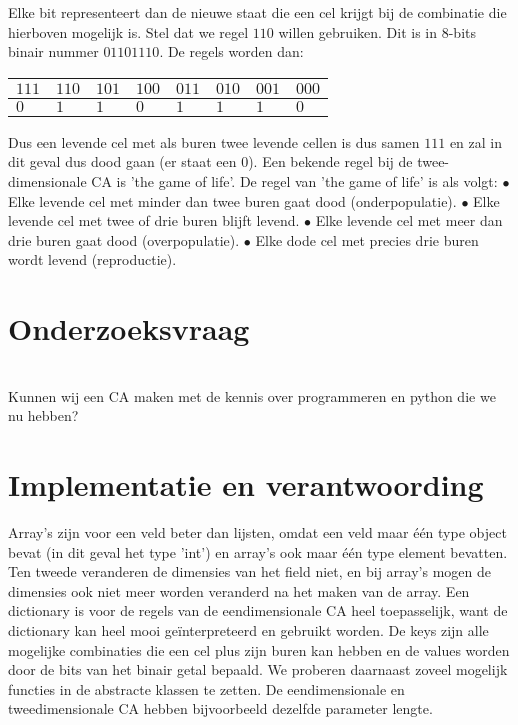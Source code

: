 \documentclass[12pt,a4paper]{article}
\begin{document}
Elke bit representeert dan de nieuwe staat die een cel krijgt bij de combinatie die hierboven mogelijk is.
Stel dat we regel $110$ willen gebruiken. Dit is in 8-bits binair nummer $01101110$.
De regels worden dan:
\begin{center}
\begin{tabular}{|m{0.6cm}|m{0.6cm}|m{0.6cm}|m{0.6cm}|m{0.6cm}|m{0.6cm}|m{0.6cm}|m{0.6cm}|}
    \hline
    $111$ & $110$ & $101$ & $100$ & $011$ & $010$ & $001$ & $000$ \\
    \hline
    $0$ & $1$ & $1$ & $0$ & $1$ & $1$ & $1$ & $0$ \\
    \hline
\end{tabular}
\end{center}
\vspace{10pt}
Dus een levende cel met als buren twee levende cellen is dus samen $111$ en zal in dit geval dus dood gaan (er staat een $0$).
Een bekende regel bij de twee-dimensionale CA is 'the game of life'. 
\newline
De regel van 'the game of life' is als volgt:
\vspace{4pt}
\newline
$\bullet$ Elke levende cel met minder dan twee buren gaat dood (onderpopulatie). 
\newline 
$\bullet$ Elke levende cel met twee of drie buren blijft levend.
\newline
$\bullet$ Elke levende cel met meer dan drie buren gaat dood (overpopulatie).
\newline 
$\bullet$ Elke dode cel met precies drie buren wordt levend (reproductie).
\newline
\section*{Onderzoeksvraag} \\
Kunnen wij een CA maken met de kennis over programmeren en python die we nu hebben?

\section*{Implementatie en verantwoording}
Array's zijn voor een veld beter dan lijsten, omdat een veld maar één type object bevat (in dit geval het type 'int') 
en array's ook maar één type element bevatten.  
Ten tweede veranderen de dimensies van het field niet, en bij array's mogen de dimensies ook niet meer worden veranderd na
het maken van de array. Een dictionary is voor de regels van de eendimensionale CA heel toepasselijk, want 
de dictionary kan heel mooi geïnterpreteerd en gebruikt worden. 
De keys zijn alle mogelijke combinaties die een cel plus zijn buren kan hebben
en de values worden door de bits van het binair getal bepaald. 
We proberen daarnaast zoveel mogelijk functies in de abstracte klassen te zetten.
De eendimensionale en tweedimensionale CA hebben bijvoorbeeld dezelfde parameter lengte.   
\end{document}
